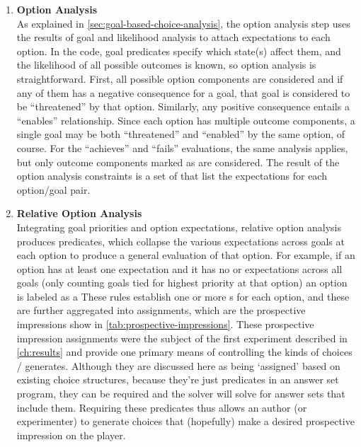 \begin{enumerate}
\item %
\textbf{Option Analysis} \\
\label{page:option-analysis}%
%
As explained in \cref{sec:goal-based-choice-analysis}, the option analysis step uses the results of goal and likelihood analysis to attach expectations to each option.
%
In the code, goal predicates specify which state(s) affect them, and the likelihood of all possible outcomes is known, so option analysis is straightforward.
%
First, all possible option components are considered and if any of them has a negative consequence for a goal, that goal is considered to be ``threatened'' by that option.
%
Similarly, any positive consequence entails a ``enables'' relationship.
%
Since each option has multiple outcome components, a single goal may be both ``threatened'' and ``enabled'' by the same option, of course.
%
For the ``achieves'' and ``fails'' evaluations, the same analysis applies, but only outcome components marked as  are considered.
%
The result of the option analysis constraints is a set of  that list the expectations for each option/goal pair.

\item %
\textbf{Relative Option Analysis} \\
%
Integrating goal priorities and option expectations, relative option analysis produces  predicates, which collapse the various expectations across goals at each option to produce a general evaluation of that option.
%
For example, if an option has at least one  expectation and it has no  or  expectations across all goals (only counting goals tied for highest priority at that option) an option is labeled as a 
%
These rules establish one or more s for each option, and these are further aggregated into  assignments, which are the prospective impressions show in \cref{tab:prospective-impressions}.
%
These prospective impression assignments were the subject of the first experiment described in \cref{ch:results} and provide one primary means of controlling the kinds of choices \dunyazad/ generates.
%
Although they are discussed here as being `assigned' based on existing choice structures, because they're just predicates in an answer set program, they can be required and the solver will solve for answer sets that include them.
%
Requiring these  predicates thus allows an author (or experimenter) to generate choices that (hopefully) make a desired prospective impression on the player.


\end{enumerate}
